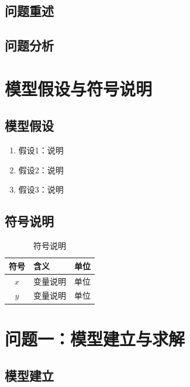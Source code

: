 \subsection{问题重述}

\subsection{问题分析}

\section{模型假设与符号说明}

\subsection{模型假设}
\begin{enumerate}[label=\arabic*.]
  \item 假设1：说明
  \item 假设2：说明
  \item 假设3：说明
\end{enumerate}

\subsection{符号说明}
\begin{table}[H]
  \centering
  \caption{符号说明}
  \begin{tabular}{cll}
    \toprule
    符号 & 含义 & 单位 \\
    \midrule
    $x$ & 变量说明 & 单位 \\
    $y$ & 变量说明 & 单位 \\
    \bottomrule
  \end{tabular}
\end{table}

\section{问题一：模型建立与求解}

\subsection{模型建立}

